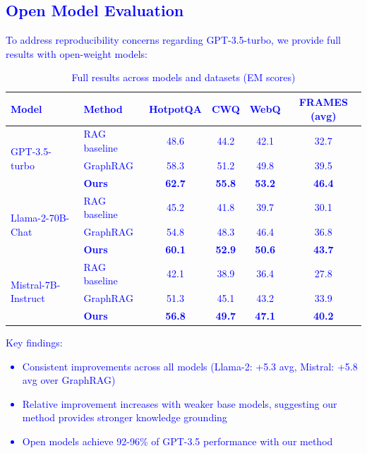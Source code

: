 \documentclass[10pt,twocolumn]{article}
\newcommand{\revision}[1]{\textcolor{blue}{#1}}
\begin{document}
\revision{
\subsection{Open Model Evaluation}
\label{sec:open_models}

To address reproducibility concerns regarding GPT-3.5-turbo, we provide full results with open-weight models:

\begin{table}[t]
\centering
\caption{Full results across models and datasets (EM scores)}
\label{tab:open_models}
\small
\begin{tabular}{@{}llcccc@{}}
\toprule
\textbf{Model} & \textbf{Method} & \textbf{HotpotQA} & \textbf{CWQ} & \textbf{WebQ} & \textbf{FRAMES (avg)} \\
\midrule
\multirow{3}{*}{GPT-3.5-turbo} & RAG baseline & 48.6 & 44.2 & 42.1 & 32.7 \\
& GraphRAG & 58.3 & 51.2 & 49.8 & 39.5 \\
& \textbf{Ours} & \textbf{62.7} & \textbf{55.8} & \textbf{53.2} & \textbf{46.4} \\
\midrule
\multirow{3}{*}{Llama-2-70B-Chat} & RAG baseline & 45.2 & 41.8 & 39.7 & 30.1 \\
& GraphRAG & 54.8 & 48.3 & 46.4 & 36.8 \\
& \textbf{Ours} & \textbf{60.1} & \textbf{52.9} & \textbf{50.6} & \textbf{43.7} \\
\midrule
\multirow{3}{*}{Mistral-7B-Instruct} & RAG baseline & 42.1 & 38.9 & 36.4 & 27.8 \\
& GraphRAG & 51.3 & 45.1 & 43.2 & 33.9 \\
& \textbf{Ours} & \textbf{56.8} & \textbf{49.7} & \textbf{47.1} & \textbf{40.2} \\
\bottomrule
\end{tabular}
\end{table}

Key findings:
\begin{itemize}
    \item Consistent improvements across all models (Llama-2: +5.3 avg, Mistral: +5.8 avg over GraphRAG)
    \item Relative improvement increases with weaker base models, suggesting our method provides stronger knowledge grounding
    \item Open models achieve 92-96\% of GPT-3.5 performance with our method
\end{itemize}
}
\end{document}
